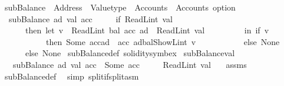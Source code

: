 \begin{isabellebody}
%
\endisatagproof
{\isafoldproof}%
%
\isadelimproof
\isanewline
%
\endisadelimproof
\isanewline
{}\isamarkupfalse%
\ subBalance\ {\isacharcolon}{\kern0pt}{\isacharcolon}{\kern0pt}\ {\isachardoublequoteopen}Address\ {\isasymRightarrow}\ Valuetype\ {\isasymRightarrow}\ Accounts\ {\isasymRightarrow}\ Accounts\ option{\isachardoublequoteclose}\isanewline
\ \ \isanewline
\ \ {\isachardoublequoteopen}subBalance\ ad\ val\ acc\ {\isacharequal}{\kern0pt}\isanewline
\ \ \ \ {\isacharparenleft}{\kern0pt}if\ ReadL\isactrlsub i\isactrlsub n\isactrlsub t\ val\ {\isasymge}\ {}\isanewline
\ \ \ \ \ \ then\ {\isacharparenleft}{\kern0pt}let\ v\ {\isacharequal}{\kern0pt}\ ReadL\isactrlsub i\isactrlsub n\isactrlsub t\ {\isacharparenleft}{\kern0pt}bal\ {\isacharparenleft}{\kern0pt}acc\ ad{\isacharparenright}{\kern0pt}{\isacharparenright}{\kern0pt}\ {\isacharminus}{\kern0pt}\ ReadL\isactrlsub i\isactrlsub n\isactrlsub t\ val\isanewline
\ \ \ \ \ \ \ \ \ in\ if\ {\isacharparenleft}{\kern0pt}v\ {\isasymge}\ {}{\isacharparenright}{\kern0pt}\isanewline
\ \ \ \ \ \ \ \ \ \ \ then\ Some\ {\isacharparenleft}{\kern0pt}acc{\isacharparenleft}{\kern0pt}ad\ {\isacharcolon}{\kern0pt}{\isacharequal}{\kern0pt}\ acc\ ad{\isasymlparr}bal{\isacharcolon}{\kern0pt}{\isacharequal}{\kern0pt}ShowL\isactrlsub i\isactrlsub n\isactrlsub t\ v{\isasymrparr}{\isacharparenright}{\kern0pt}{\isacharparenright}{\kern0pt}\isanewline
\ \ \ \ \ \ \ \ \ \ \ else\ None{\isacharparenright}{\kern0pt}\isanewline
\ \ \ \ \ \ else\ None{\isacharparenright}{\kern0pt}{\isachardoublequoteclose}\isanewline
\isanewline
{}\isamarkupfalse%
\ subBalance{\isacharunderscore}{\kern0pt}def\ {\isacharbrackleft}{\kern0pt}solidity{\isacharunderscore}{\kern0pt}symbex{\isacharbrackright}{\kern0pt}\isanewline
\isanewline
{}\isamarkupfalse%
\ subBalance{\isacharunderscore}{\kern0pt}val{}{\isacharcolon}{\kern0pt}\isanewline
\ \ \ {\isachardoublequoteopen}subBalance\ ad\ val\ acc\ {\isacharequal}{\kern0pt}\ Some\ acc{\isacharprime}{\kern0pt}{\isachardoublequoteclose}\isanewline
\ \ \ \ \ {\isachardoublequoteopen}ReadL\isactrlsub i\isactrlsub n\isactrlsub t\ val\ {\isasymge}\ {}{\isachardoublequoteclose}\isanewline
%
\isadelimproof
%
\endisadelimproof
%
\isatagproof
{}\isamarkupfalse%
\ assms\ \isamarkupfalse%
\ subBalance{\isacharunderscore}{\kern0pt}def\ \isamarkupfalse%
\ {\isacharparenleft}{\kern0pt}simp\ split{\isacharcolon}{\kern0pt}if{\isacharunderscore}{\kern0pt}split{\isacharunderscore}{\kern0pt}asm{\isacharparenright}{\kern0pt}%

\end{isabellebody}
